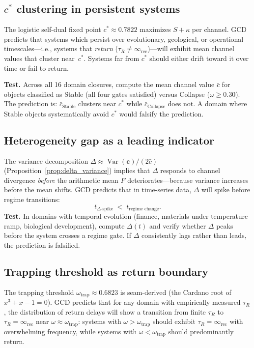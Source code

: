 \documentclass[
  aps,
  prd,
  preprint,
  superscriptaddress,
  nofootinbib,
  floatfix
]{revtex4-2}
\newcommand{\Rinf}{\infty_{\mathrm{rec}}}
\begin{document}
\subsection{$c^*$ clustering in persistent systems}
\label{pred:cstar}

The logistic self-dual fixed point $c^*\approx 0.7822$
maximizes $S+\kappa$ per channel.
GCD predicts that systems which persist over evolutionary,
geological, or operational timescales---i.e., systems
that \emph{return} ($\tau_R \neq \Rinf$)---will exhibit mean
channel values that cluster near~$c^*$.
Systems far from $c^*$ should either drift toward it over
time or fail to return.

\textbf{Test.} Across all 16 domain closures, compute the mean channel value $\bar{c}$ for objects classified
as Stable (all four gates satisfied) versus Collapse ($\omega\ge 0.30$).
The prediction is: $\bar{c}_{\text{Stable}}$ clusters near $c^*$ while $\bar{c}_{\text{Collapse}}$ does not.
A domain where Stable objects systematically avoid $c^*$ would falsify the prediction.

\subsection{Heterogeneity gap as a leading indicator}
\label{pred:delta_leading}

The variance decomposition $\Delta \approx \operatorname{Var}(\bm{c})/(2\bar{c})$
(Proposition~\ref{prop:delta_variance}) implies that $\Delta$ responds to channel divergence
\emph{before} the arithmetic mean $F$ deteriorates---because variance increases before the mean shifts.
GCD predicts that in time-series data, $\Delta$ will spike before regime transitions:
\begin{equation}
  t_{\Delta\text{-spike}} \;<\; t_{\text{regime change}}.
\end{equation}
\textbf{Test.} In domains with temporal evolution (finance, materials under temperature ramp, biological
development), compute $\Delta(t)$ and verify whether $\Delta$ peaks before the system crosses a regime gate.
If $\Delta$ consistently lags rather than leads, the prediction is falsified.

\subsection{Trapping threshold as return boundary}
\label{pred:omega_trap}

The trapping threshold $\omega_{\mathrm{trap}}\approx 0.6823$ is seam-derived (the Cardano root of $x^3+x-1=0$).
GCD predicts that for any domain with empirically measured $\tau_R$, the distribution of return delays will
show a transition from finite $\tau_R$ to $\tau_R = \Rinf$ near $\omega \approx \omega_{\mathrm{trap}}$:
systems with $\omega > \omega_{\mathrm{trap}}$ should exhibit $\tau_R = \Rinf$ with overwhelming frequency,
while systems with $\omega < \omega_{\mathrm{trap}}$ should predominantly return.
\end{document}
